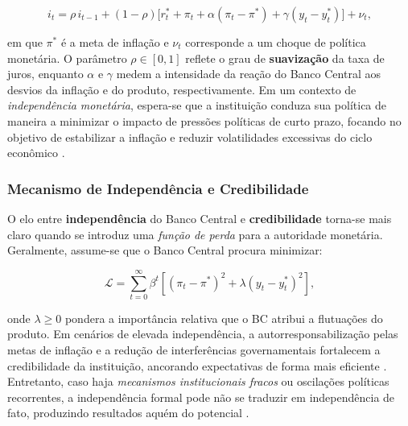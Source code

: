 \documentclass[a4paper,12pt]{article}[abnt2]
\begin{document}
\begin{equation}
i_t = \rho \, i_{t-1} + (1 - \rho) \big[ r_t^* + \pi_t + \alpha (\pi_t - \pi^*) + \gamma (y_t - y_t^*) \big] + \nu_t,
\end{equation}

em que $\pi^*$ é a meta de inflação e $\nu_t$ corresponde a um choque de política monetária. O parâmetro $\rho \in [0,1]$ reflete o grau de \textbf{suavização} da taxa de juros, enquanto $\alpha$ e $\gamma$ medem a intensidade da reação do Banco Central aos desvios da inflação e do produto, respectivamente. Em um contexto de \emph{independência monetária}, espera-se que a instituição conduza sua política de maneira a minimizar o impacto de pressões políticas de curto prazo, focando no objetivo de estabilizar a inflação e reduzir volatilidades excessivas do ciclo econômico \cite{adrian2024,woodford2003, unsal2023, gali2015}.

\subsubsection{\textbf{Mecanismo de Independência e Credibilidade}}
O elo entre \textbf{independência} do Banco Central e \textbf{credibilidade} torna-se mais claro quando se introduz uma \emph{função de perda} para a autoridade monetária. Geralmente, assume-se que o Banco Central procura minimizar:

\begin{equation}
\mathcal{L} = \sum_{t=0}^{\infty} \beta^t \left[ (\pi_t - \pi^*)^2 + \lambda (y_t - y_t^*)^2 \right],
\end{equation}

onde $\lambda \ge 0$ pondera a importância relativa que o BC atribui a flutuações do produto\cite{woodford2003, unsal2023, gali2015}. Em cenários de elevada independência, a autorresponsabilização pelas metas de inflação e a redução de interferências governamentais fortalecem a credibilidade da instituição, ancorando expectativas de forma mais eficiente \cite{jacome2022}. Entretanto, caso haja \emph{mecanismos institucionais fracos} ou oscilações políticas recorrentes, a independência formal pode não se traduzir em independência de fato, produzindo resultados aquém do potencial \cite{acemoglu2008}.
\end{document}

